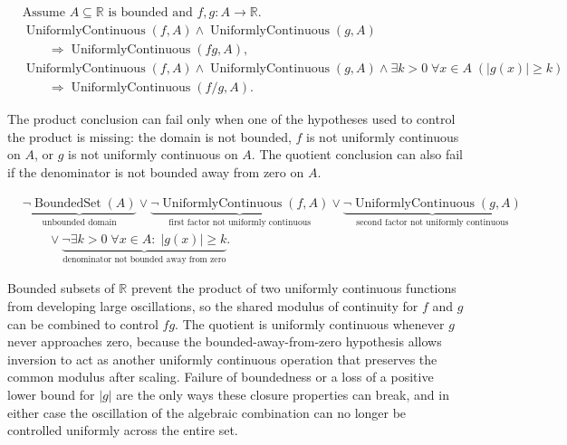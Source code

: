 \begin{remark*}
\[
\begin{aligned}
&\text{Assume } A \subseteq \mathbb{R} \text{ is bounded and } f,g:A \to \mathbb{R}.\\
&\operatorname{UniformlyContinuous}(f,A) \land \operatorname{UniformlyContinuous}(g,A)\\
&\qquad\Longrightarrow \operatorname{UniformlyContinuous}(fg,A),\\
&\operatorname{UniformlyContinuous}(f,A) \land \operatorname{UniformlyContinuous}(g,A) \land \exists k>0\;\forall x \in A\;(|g(x)| \ge k)\\
&\qquad\Longrightarrow \operatorname{UniformlyContinuous}(f/g,A).
\end{aligned}
\]
\end{remark*}

\begin{remark*}
The product conclusion can fail only when one of the hypotheses used to
control the product is missing: the domain is not bounded, $f$ is not
uniformly continuous on $A$, or $g$ is not uniformly continuous on $A$.
The quotient conclusion can also fail if the denominator is not bounded
away from zero on $A$.
\end{remark*}

\begin{remark*}
\[
\begin{aligned}
&\underbrace{\neg\operatorname{BoundedSet}(A)}_{\text{unbounded domain}}
\lor
\underbrace{\neg\operatorname{UniformlyContinuous}(f,A)}_{\text{first factor not uniformly continuous}}
\lor
\underbrace{\neg\operatorname{UniformlyContinuous}(g,A)}_{\text{second factor not uniformly continuous}}\\
&\qquad\lor
\underbrace{\neg\exists k>0\;\forall x\in A:\; |g(x)|\ge k}_{\text{denominator not bounded away from zero}}.
\end{aligned}
\]
\end{remark*}

\begin{remark*}[Interpretation]
Bounded subsets of $\mathbb{R}$ prevent the product of two uniformly continuous functions from developing large oscillations, so the shared modulus of continuity for $f$ and $g$ can be combined to control $fg$. The quotient is uniformly continuous whenever $g$ never approaches zero, because the bounded-away-from-zero hypothesis allows inversion to act as another uniformly continuous operation that preserves the common modulus after scaling. Failure of boundedness or a loss of a positive lower bound for $|g|$ are the only ways these closure properties can break, and in either case the oscillation of the algebraic combination can no longer be controlled uniformly across the entire set.
\end{remark*}

